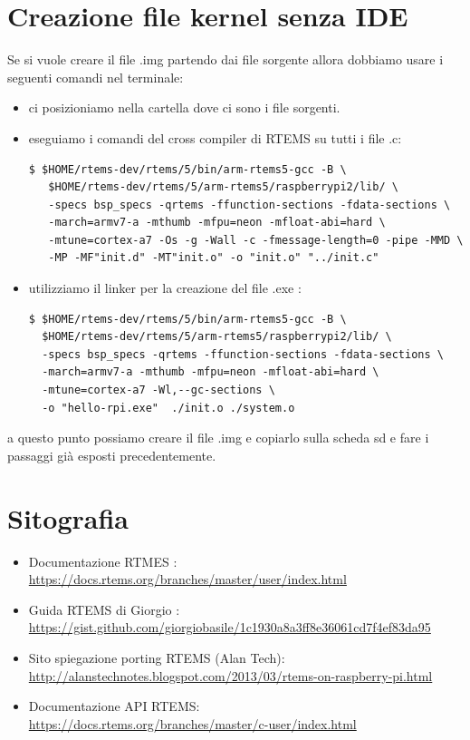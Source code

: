 \documentclass[12pt, a4paper]{article}
\begin{document}
\begin{flushleft}
\newpage
\section{Creazione file kernel senza IDE}
Se si vuole creare il file .img partendo dai file sorgente allora dobbiamo usare i seguenti comandi nel terminale:
\begin{itemize}
\item ci posizioniamo nella cartella dove ci sono i file sorgenti.
\item eseguiamo i comandi del cross compiler di RTEMS su tutti i file .c: 
\begin{lstlisting}[style=BashStyle] 
 $ $HOME/rtems-dev/rtems/5/bin/arm-rtems5-gcc -B \
   $HOME/rtems-dev/rtems/5/arm-rtems5/raspberrypi2/lib/ \
   -specs bsp_specs -qrtems -ffunction-sections -fdata-sections \
   -march=armv7-a -mthumb -mfpu=neon -mfloat-abi=hard \ 
   -mtune=cortex-a7 -Os -g -Wall -c -fmessage-length=0 -pipe -MMD \
   -MP -MF"init.d" -MT"init.o" -o "init.o" "../init.c"
\end{lstlisting}
\item utilizziamo il linker per la creazione del file .exe :
\begin{lstlisting}[style=BashStyle] 
$ $HOME/rtems-dev/rtems/5/bin/arm-rtems5-gcc -B \
  $HOME/rtems-dev/rtems/5/arm-rtems5/raspberrypi2/lib/ \
  -specs bsp_specs -qrtems -ffunction-sections -fdata-sections \
  -march=armv7-a -mthumb -mfpu=neon -mfloat-abi=hard \ 
  -mtune=cortex-a7 -Wl,--gc-sections \ 
  -o "hello-rpi.exe"  ./init.o ./system.o    
\end{lstlisting}

\end{itemize}
\item a questo punto possiamo creare il file .img e copiarlo sulla scheda sd e fare i passaggi già esposti precedentemente.

\newpage
\section{Sitografia}
\begin{itemize}
\item Documentazione RTMES :\\ \url{https://docs.rtems.org/branches/master/user/index.html}
\item Guida RTEMS di Giorgio :\\ \url{https://gist.github.com/giorgiobasile/1c1930a8a3ff8e36061cd7f4ef83da95}
\item Sito spiegazione porting RTEMS (Alan Tech):\\ \url{http://alanstechnotes.blogspot.com/2013/03/rtems-on-raspberry-pi.html} 
\item Documentazione API RTEMS:\\ \url{https://docs.rtems.org/branches/master/c-user/index.html}
\end{itemize}

\end{flushleft}
\end{document}
